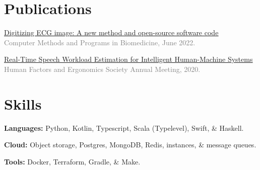 \documentclass[10pt]{article} %
\let\defaultref\href
\renewcommand{\href}[2]{%
  \defaultref{#1}{\ul{#2}}%
}
\renewcommand{\emph}[1]{%
  \textcolor{gray}{#1}%
}
\begin{document}
\begin{paracol}{2}
\hypertarget{publications}{%
\section{Publications}\label{publications}}

\vspace{1pt}

\href{https://doi.org/10.1101/2021.07.13.21260461}{Digitizing ECG image:
A new method and open-source software code}\\
\emph{Computer Methods and Programs in Biomedicine, June 2022.}

\href{https://doi.org/10.1177/1071181320641076}{Real-Time Speech
Workload Estimation for Intelligent Human-Machine Systems}\\
\emph{Human Factors and Ergonomics Society Annual Meeting, 2020.}

\hypertarget{skills}{%
\section{Skills}\label{skills}}

\textbf{Languages:} Python, Kotlin, Typescript, Scala (Typelevel),
Swift, \& Haskell.

\textbf{Cloud:} Object storage, Postgres, MongoDB, Redis, instances, \&
message queues.

\textbf{Tools:} Docker, Terraform, Gradle, \& Make.

\end{paracol}

\end{document}
